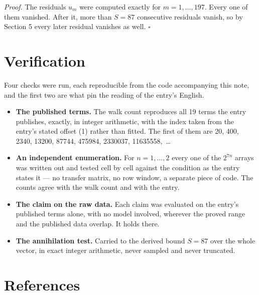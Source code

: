 \documentclass[11pt]{article}
\theoremstyle{definition}
\begin{document}
{\itshape Proof.} The residuals $u_m$ were computed exactly for $m = 1,\dots,197$. Every one of them vanished. After it, more than $S = 87$ consecutive residuals vanish, so by Section 5 every later residual vanishes as well. $\square$

\section{Verification}

Four checks were run, each reproducible from the code accompanying this note, and the first two are what pin the reading of the entry's English.

\begin{itemize}

\item {\bfseries The published terms.} The walk count reproduces all 19 terms the entry publishes, exactly, in integer arithmetic, with the index taken from the entry's stated offset (1) rather than fitted. The first of them are 20, 400, 2340, 13200, 87744, 475984, 2330037, 11635558,~\dots

\item {\bfseries An independent enumeration.} For $n = 1,\dots,2$ every one of the $2^{7n}$ arrays was written out and tested cell by cell against the condition as the entry states it --- no transfer matrix, no row window, a separate piece of code. The counts agree with the walk count and with the entry.

\item {\bfseries The claim on the raw data.} Each claim was evaluated on the entry's published terms alone, with no model involved, wherever the proved range and the published data overlap. It holds there.

\item {\bfseries The annihilation test.} Carried to the derived bound $S = 87$ over the whole vector, in exact integer arithmetic, never sampled and never truncated.

\end{itemize}

\section{References}
\end{document}

